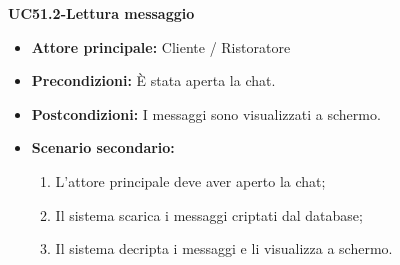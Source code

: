 \textbf{UC51.2-Lettura messaggio}  %
\begin{itemize}
\item \textbf{Attore principale:} Cliente / Ristoratore
\item \textbf{Precondizioni:} È stata aperta la chat.
\item \textbf{Postcondizioni:} I messaggi sono visualizzati a schermo.
\item \textbf{Scenario secondario:}
\begin{enumerate}
    \item L'attore principale deve aver aperto la chat;
    \item Il sistema scarica i messaggi criptati dal database;
    \item Il sistema decripta i messaggi e li visualizza a schermo.
\end{enumerate}
\end{itemize}
